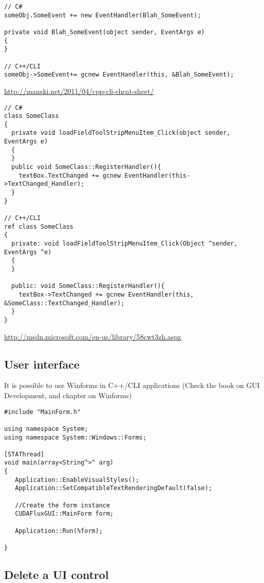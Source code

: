 \begin{verbatim}
// C#
someObj.SomeEvent += new EventHandler(Blah_SomeEvent);

private void Blah_SomeEvent(object sender, EventArgs e)
{
}

// C++/CLI
someObj->SomeEvent+= gcnew EventHandler(this, &Blah_SomeEvent);
\end{verbatim}

\url{http://manski.net/2011/04/cpp-cli-cheat-sheet/}
\begin{verbatim}
// C#
class SomeClass 
{
  private void loadFieldToolStripMenuItem_Click(object sender, EventArgs e)
  {
  }
  public void SomeClass::RegisterHandler(){
    textBox.TextChanged += gcnew EventHandler(this->TextChanged_Handler); 
  }
}

// C++/CLI
ref class SomeClass 
{
  private: void loadFieldToolStripMenuItem_Click(Object ^sender, EventArgs ^e)
  {
  }
  
  public: void SomeClass::RegisterHandler(){
    textBox->TextChanged += gcnew EventHandler(this, &SomeClass::TextChanged_Handler);
  }
}  
\end{verbatim}

\url{http://msdn.microsoft.com/en-us/library/58cwt3zh.aspx}


\subsection{User interface}

It is possible to use Winforms in C++/CLI applications (Check the book on GUI
Development, and chapter on Winforms)

\begin{verbatim}
#include "MainForm.h"

using namespace System;
using namespace System::Windows::Forms;

[STAThread]
void main(array<String^>^ arg) 
{
   Application::EnableVisualStyles();
   Application::SetCompatibleTextRenderingDefault(false);
   
   //Create the form instance
   CUDAFluxGUI::MainForm form;
   
   Application::Run(%form);

}
\end{verbatim}

\subsection{Delete a UI control}

